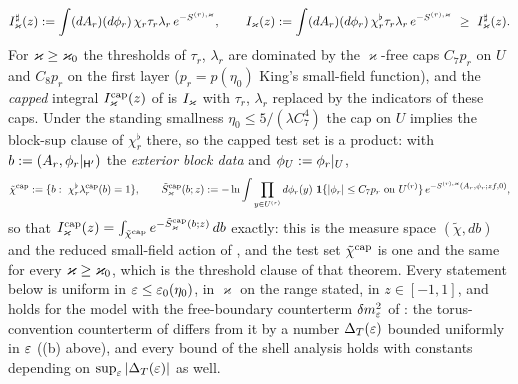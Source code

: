 \[
\Ish_\varkappa(z)\defeq\int(dA_r)(d\phi_r)\,\chi_r\tau_r\lambda_r\,e^{-S^{(r),\varkappa}},\qquad
\Ifull_\varkappa(z)\defeq\int(dA_r)(d\phi_r)\,\chi_r^\flat\tau_r\lambda_r\,e^{-S^{(r),\varkappa}}\ \ge\ \Ish_\varkappa(z).
\]
For $\varkappa\ge\varkappa_0$ the thresholds of $\tau_r$, $\lambda_r$ are dominated by the $\varkappa$-free caps $C_7p_r$ on $U$ and $C_8p_r$ on the first layer ($p_r=p(\eta_0)$ King's small-field function), and the \emph{capped} integral $I^{\mathrm{cap}}_\varkappa(z)$ of  is $I_\varkappa$ with $\tau_r$, $\lambda_r$ replaced by the indicators of these caps. Under the standing smallness $\eta_0\le5/(\lambda C_7^4)$ the cap on $U$ implies the block-sup clause of $\chi_r^\flat$ there, so the capped test set is a product: with $b:=(A_r,\phi_r|_{\mathsf H'})$ the \emph{exterior block data} and $\phi_U:=\phi_r|_U$,
\[
\chicap\defeq\{b:\ \chi_r^\flat\lambda^{\rm cap}_r(b)=1\},\qquad
\Scap_\varkappa(b;z)\defeq-\ln\int\prod_{y\in U^{(r)}}d\phi_r(y)\ \mathbf 1\{|\phi_r|\le C_7p_r\text{ on }U^{(r)}\}\,e^{-S^{(r),\varkappa}(A_r,\phi_r;zf,0)},
\]
so that $I^{\mathrm{cap}}_\varkappa(z)=\int_{\tilde\chi^{\mathrm{cap}}}e^{-\tilde S^{\mathrm{cap}}_\varkappa(b;z)}\,db$ exactly: this is the measure space $(\tilde\chi,db)$ and the reduced small-field action of , and the test set $\tilde\chi^{\mathrm{cap}}$ is one and the same for every $\varkappa\ge\varkappa_0$, which is the threshold clause of that theorem. Every statement below is uniform in $\varepsilon\le\varepsilon_0(\eta_0)$, in $\varkappa$ on the range stated, in $z\in[-1,1]$, and holds for the model with the free-boundary counterterm $\delta m^2_{\varepsilon}$ of : the torus-convention counterterm of \cite{K1} differs from it by a number $\Delta_T(\varepsilon)$ bounded uniformly in $\varepsilon$ ((b) above), and every bound of the shell analysis holds with constants depending on $\sup_{\varepsilon}|\Delta_T(\varepsilon)|$ as well.

